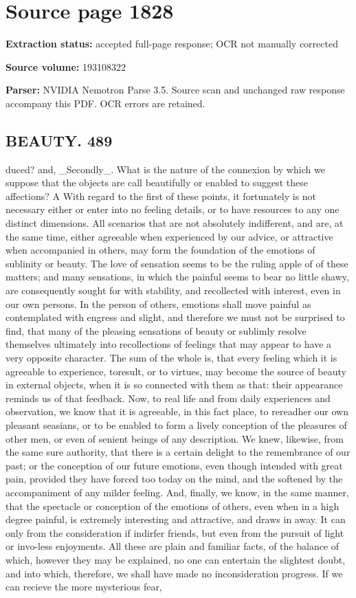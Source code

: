 \clearpage
\section{Source page 1828}
\textbf{Extraction status:} accepted full-page response; OCR not manually corrected\par
\textbf{Source volume:} 193108322\par
\textbf{Parser:} NVIDIA Nemotron Parse 3.5. Source scan and unchanged raw response accompany this PDF. OCR errors are retained.\par\medskip
\subsection*{BEAUTY. 489}
duced? and, \_Secondly\_. What is the nature of the connexion by which we suppose that the objects are call beautifully or enabled to suggest these affections? A With regard to the first of these points, it fortunately is not necessary either or enter into no feeling details, or to have resources to any one distinct dimensions. All scenarios that are not absolutely indifferent, and are, at the same time, either agreeable when experienced by our advice, or attractive when accompanied in others, may form the foundation of the emotions of sublinity or beauty. The love of sensation seems to be the ruling apple of of these matters; and many sensations, in which the painful seems to bear no little shawy, are consequently sought for with stability, and recollected with interest, even in our own persons. In the person of others, emotions shall move painful as contemplated with engress and slight, and therefore we must not be surprised to find, that many of the pleasing sensations of beauty or sublimly resolve themselves ultimately into recollections of feelings that may appear to have a very opposite character. The sum of the whole is, that every feeling which it is agreeable to experience, toresult, or to virtues, may become the source of beauty in external objects, when it is so connected with them as that: their appearance reminds us of that feedback. Now, to real life and from daily experiences and observation, we know that it is agreeable, in this fact place, to rereadher our own pleasant seasians, or to be enabled to form a lively conception of the pleasures of other men, or even of senient beings of any description. We knew, likewise, from the same sure authority, that there is a certain delight to the remembrance of our past; or the conception of our future emotions, even though intended with great pain, provided they have forced too today on the mind, and the softened by the accompaniment of any milder feeling. And, finally, we know, in the same manner, that the spectacle or conception of the emotions of others, even when in a high degree painful, is extremely interesting and attractive, and draws in away. It can only from the consideration if indirfer friends, but even from the pursuit of light or invo-less enjoyments. All these are plain and familiar facts, of the balance of which, however they may be explained, no one can entertain the slightest doubt, and into which, therefore, we shall have made no inconsideration progress. If we can recieve the more mysterious fear, 